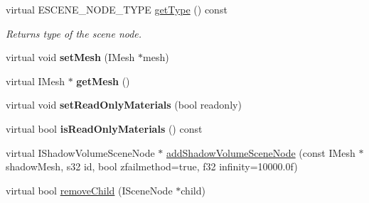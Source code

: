 \begin{DoxyCompactItemize}
\item 
\hypertarget{classirr_1_1scene_1_1_c_quake3_shader_scene_node_a00927fee121b1bed92e6b5253b6470b3}{virtual E\-S\-C\-E\-N\-E\-\_\-\-N\-O\-D\-E\-\_\-\-T\-Y\-P\-E \hyperlink{classirr_1_1scene_1_1_c_quake3_shader_scene_node_a00927fee121b1bed92e6b5253b6470b3}{get\-Type} () const }\label{classirr_1_1scene_1_1_c_quake3_shader_scene_node_a00927fee121b1bed92e6b5253b6470b3}

\begin{DoxyCompactList}\small\item\em Returns type of the scene node. \end{DoxyCompactList}\item 
\hypertarget{classirr_1_1scene_1_1_c_quake3_shader_scene_node_a06661cf7d3422ba4911768d19ec056ed}{virtual void {\bfseries set\-Mesh} (I\-Mesh $\ast$mesh)}\label{classirr_1_1scene_1_1_c_quake3_shader_scene_node_a06661cf7d3422ba4911768d19ec056ed}

\item 
\hypertarget{classirr_1_1scene_1_1_c_quake3_shader_scene_node_a7a3748881b8a2d507eacd6423014de4d}{virtual I\-Mesh $\ast$ {\bfseries get\-Mesh} ()}\label{classirr_1_1scene_1_1_c_quake3_shader_scene_node_a7a3748881b8a2d507eacd6423014de4d}

\item 
\hypertarget{classirr_1_1scene_1_1_c_quake3_shader_scene_node_abf940b4fad0b8d5a4692abaa6456df0f}{virtual void {\bfseries set\-Read\-Only\-Materials} (bool readonly)}\label{classirr_1_1scene_1_1_c_quake3_shader_scene_node_abf940b4fad0b8d5a4692abaa6456df0f}

\item 
\hypertarget{classirr_1_1scene_1_1_c_quake3_shader_scene_node_abddf3d8afdd278619e03fd6c3023cf16}{virtual bool {\bfseries is\-Read\-Only\-Materials} () const }\label{classirr_1_1scene_1_1_c_quake3_shader_scene_node_abddf3d8afdd278619e03fd6c3023cf16}

\item 
virtual I\-Shadow\-Volume\-Scene\-Node $\ast$ \hyperlink{classirr_1_1scene_1_1_c_quake3_shader_scene_node_a1e73c3a6baab26b0f77e31cbf6a1c1cd}{add\-Shadow\-Volume\-Scene\-Node} (const I\-Mesh $\ast$shadow\-Mesh, s32 id, bool zfailmethod=true, f32 infinity=10000.\-0f)
\item 
virtual bool \hyperlink{classirr_1_1scene_1_1_c_quake3_shader_scene_node_ab630d516c0d65f80b7d6f7bf096a6203}{remove\-Child} (I\-Scene\-Node $\ast$child)
\end{DoxyCompactItemize}


